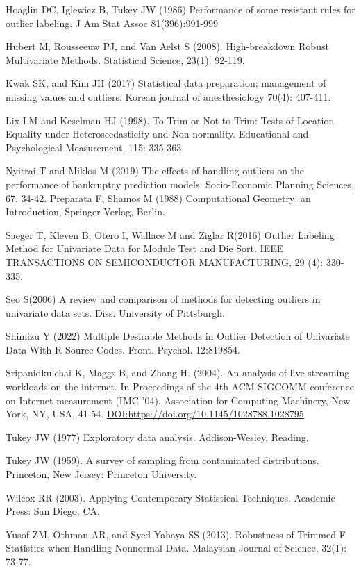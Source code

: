 \documentclass[notitlepage,12pt]{jedm}
\begin{document}
Hoaglin DC, Iglewicz B, Tukey JW (1986) Performance of some resistant
rules for outlier labeling. J Am Stat Assoc 81(396):991-999

Hubert M, Rousseeuw PJ, and Van Aelst S (2008). High-breakdown Robust
Multivariate Methods. Statistical Science, 23(1): 92-119.

Kwak SK, and Kim JH (2017) Statistical data preparation: management of
missing values and outliers. Korean journal of anesthesiology 70(4):
407-411.

Lix LM and Keselman HJ (1998). To Trim or Not to Trim: Tests of Location
Equality under Heteroscedasticity and Non-normality. Educational and
Psychological Measurement, 115: 335-363.

Nyitrai T and Miklos M (2019) The effects of handling outliers on the
performance of bankruptcy prediction models. Socio-Economic Planning
Sciences, 67, 34-42. Preparata F, Shamos M (1988) Computational
Geometry: an Introduction, Springer-Verlag, Berlin.

Saeger T, Kleven B, Otero I, Wallace M and Ziglar R(2016) Outlier
Labeling Method for Univariate Data for Module Test and Die Sort. IEEE
TRANSACTIONS ON SEMICONDUCTOR MANUFACTURING, 29 (4): 330-335.

Seo S(2006) A review and comparison of methods for detecting outliers in
univariate data sets. Diss. University of Pittsburgh.

Shimizu Y (2022) Multiple Desirable Methods in Outlier Detection of
Univariate Data With R Source Codes. Front. Psychol. 12:819854.

Sripanidkulchai K, Maggs B, and Zhang H. (2004). An analysis of live
streaming workloads on the internet. In Proceedings of the 4th ACM
SIGCOMM conference on Internet measurement (IMC '04). Association for
Computing Machinery, New York, NY, USA, 41-54.
\url{DOI:https://doi.org/10.1145/1028788.1028795}

Tukey JW (1977) Exploratory data analysis. Addison-Wesley, Reading.

Tukey JW (1959). A survey of sampling from contaminated distributions.
Princeton, New Jersey: Princeton University.

Wilcox RR (2003). Applying Contemporary Statistical Techniques. Academic
Press: San Diego, CA.

Yusof ZM, Othman AR, and Syed Yahaya SS (2013). Robustness of Trimmed F
Statistics when Handling Nonnormal Data. Malaysian Journal of Science,
32(1): 73-77.


\end{document}
